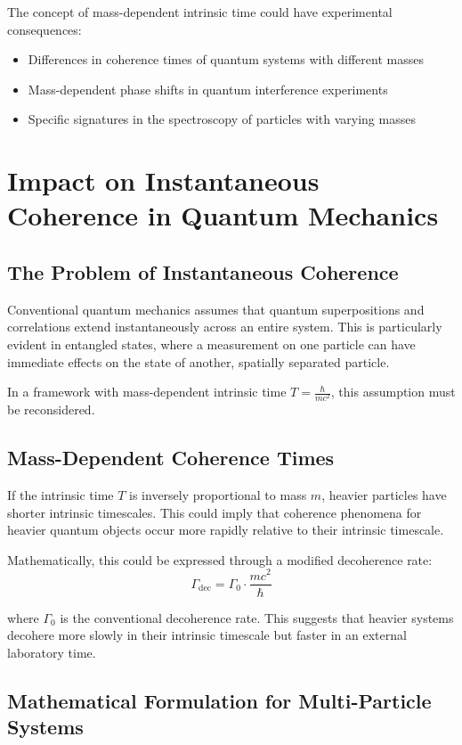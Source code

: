 \documentclass{article}
\begin{document}
	The concept of mass-dependent intrinsic time could have experimental consequences:
	\begin{itemize}
		\item Differences in coherence times of quantum systems with different masses
		\item Mass-dependent phase shifts in quantum interference experiments
		\item Specific signatures in the spectroscopy of particles with varying masses
	\end{itemize}
	
	\section{Impact on Instantaneous Coherence in Quantum Mechanics}
	
	\subsection{The Problem of Instantaneous Coherence}
	
	Conventional quantum mechanics assumes that quantum superpositions and correlations extend instantaneously across an entire system. This is particularly evident in entangled states, where a measurement on one particle can have immediate effects on the state of another, spatially separated particle.
	
	In a framework with mass-dependent intrinsic time \(T = \frac{\hbar}{mc^2}\), this assumption must be reconsidered.
	
	\subsection{Mass-Dependent Coherence Times}
	
	If the intrinsic time \(T\) is inversely proportional to mass \(m\), heavier particles have shorter intrinsic timescales. This could imply that coherence phenomena for heavier quantum objects occur more rapidly relative to their intrinsic timescale.
	
	Mathematically, this could be expressed through a modified decoherence rate:
	\[
	\Gamma_{\text{dec}} = \Gamma_0 \cdot \frac{mc^2}{\hbar}
	\]
	
	where \(\Gamma_0\) is the conventional decoherence rate. This suggests that heavier systems decohere more slowly in their intrinsic timescale but faster in an external laboratory time.
	
	\subsection{Mathematical Formulation for Multi-Particle Systems}
	
\end{document}
